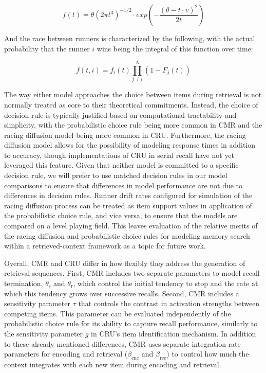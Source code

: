 \documentclass[
  man,
  floatsintext,
  longtable,
  nolmodern,
  notxfonts,
  notimes,
  draftfirst,
  colorlinks=true,linkcolor=blue,citecolor=blue,urlcolor=blue]{apa7}
\begin{document}
\[
f(t) = \theta (2 \pi t^3)^{-1/2} \cdot exp(-\frac{(\theta - t \cdot v)^2}{2t})
\]

And the race between runners is characterized by the following, with the
actual probability that the runner \(i\) wins being the integral of this
function over time:

\[
f(t, i) = {f_i}(t) \prod_{j \neq i}^{N} (1 - F_j(t))
\]

The way either model approaches the choice between items during
retrieval is not normally treated as core to their theoretical
commitments. Instead, the choice of decision rule is typically justified
based on computational tractability and simplicity, with the
probabilistic choice rule being more common in CMR and the racing
diffusion model being more common in CRU. Furthermore, the racing
diffusion model allows for the possibility of modeling response times in
addition to accuracy, though implementations of CRU in serial recall
have not yet leveraged this feature. Given that neither model is
committed to a specific decision rule, we will prefer to use matched
decision rules in our model comparisons to ensure that differences in
model performance are not due to differences in decision rules. Runner
drift rates configured for simulation of the racing diffusion process
can be treated as item support values in application of the
probabilistic choice rule, and vice versa, to ensure that the models are
compared on a level playing field. This leaves evaluation of the
relative merits of the racing diffusion and probabilistic choice rules
for modeling memory search within a retrieved-context framework as a
topic for future work.

Overall, CMR and CRU differ in how flexibly they address the generation
of retrieval sequences. First, CMR includes two separate parameters to
model recall termination, \(\theta_\text{s}\) and \(\theta_\text{r}\),
which control the initial tendency to stop and the rate at which this
tendency grows over successive recalls. Second, CMR includes a
sensitivity parameter \(\tau\) that controls the contrast in activation
strengths between competing items. This parameter can be evaluated
independently of the probabilistic choice rule for its ability to
capture recall performance, similarly to the sensitivity parameter \(g\)
in CRU's item identification mechanism. In addition to these already
mentioned differences, CMR uses separate integration rate parameters for
encoding and retrieval (\(\beta_\text{enc}\) and \(\beta_\text{rec}\))
to control how much the context integrates with each new item during
encoding and retrieval.
\end{document}
